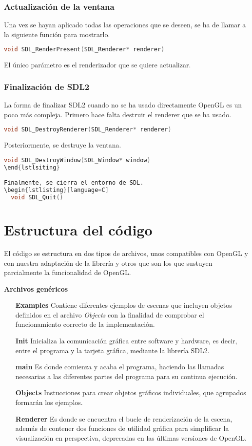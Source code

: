 \subsubsection{Actualización de la ventana}
Una vez se hayan aplicado todas las operaciones que se deseen, se ha de llamar a la siguiente función para mostrarlo.
\begin{lstlisting}[language=C]
  void SDL_RenderPresent(SDL_Renderer* renderer)
\end{lstlisting}
El único parámetro es el renderizador que se quiere actualizar.
\newpage

\subsubsection{Finalización de SDL2}
La forma de finalizar SDL2 cuando no se ha usado directamente OpenGL es un poco más compleja.
Primero hace falta destruir el renderer que se ha usado.
\begin{lstlisting}[language=C]
  void SDL_DestroyRenderer(SDL_Renderer* renderer)
\end{lstlisting}
Posteriormente, se destruye la ventana.
\begin{lstlisting}[language=C]
  void SDL_DestroyWindow(SDL_Window* window)
\end{lstlsiting}

Finalmente, se cierra el entorno de SDL.
\begin{lstlisting}[language=C]
  void SDL_Quit()
\end{lstlisting}

\section{Estructura del código}

El código se estructura en dos tipos de archivos, unos compatibles con
OpenGL y con nuestra adaptación de la librería y otros que son los que
sustuyen parcialmente la funcionalidad de OpenGL. 

\textbf{Archivos genéricos}
\begin{itemize}
	\item [\textbf{Examples}] Contiene diferentes ejemplos de escenas que incluyen objetos definidos en el archivo \textit{Objects} con la finalidad de comprobar el funcionamiento correcto de la implementación.
	\item [\textbf{Init}] Inicializa la comunicación gráfica entre software y hardware, es decir, entre el programa y la tarjeta gráfica,  mediante la librería SDL2.
	\item [\textbf{main}] Es donde comienza y acaba el programa, haciendo las llamadas necesarias a las diferentes partes del programa para su continua ejecución.
	\item [\textbf{Objects}] Instucciones para crear objetos gráficos individuales, que agrupados formarán los ejemplos.
	\item [\textbf{Renderer}] Es donde se encuentra el bucle de renderización de la escena, además de contener dos funciones de utilidad gráfica para simplificar la visualización en perspectiva, deprecadas en las últimas versiones de OpenGL.
\end{itemize}

